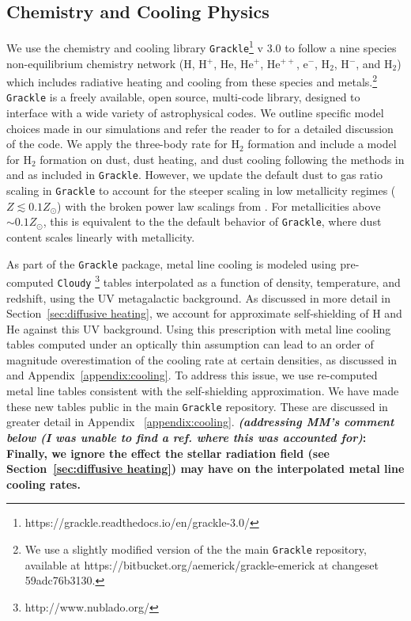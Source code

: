 \documentclass[twocolumn]{aastex61}
\begin{document}
\subsection{Chemistry and Cooling Physics}
\label{sec:chemistry}

We use the chemistry and cooling library \texttt{Grackle}\footnote{https://grackle.readthedocs.io/en/grackle-3.0/} v 3.0 to follow a nine species non-equilibrium chemistry network (H, H$^+$, He, He$^+$, He$^{++}$, e$^{-}$, H$_2$, H$^{-}$, and H$_{2}$) which includes radiative heating and cooling from these species and metals.\footnote{We use a slightly modified version of the the main \texttt{Grackle} repository, available at https://bitbucket.org/aemerick/grackle-emerick at changeset 59adc76b3130.} \texttt{Grackle} is a freely available, open source, multi-code library, designed to interface with a wide variety of astrophysical codes. We outline specific model choices made in our simulations and refer the reader to \citet{GrackleMethod} for a detailed discussion of the code. We apply the \citet{Glover2008} three-body rate for H$_{2}$ formation and include a model for H$_2$ formation on dust, dust heating, and dust cooling following the methods in \citet{2000ApJ...534..809O} and \citet{2005ApJ...626..627O} as included in \texttt{Grackle}. However, we update the default dust to gas ratio scaling in \texttt{Grackle} to account for the steeper scaling in low metallicity regimes ($Z \lesssim 0.1 Z_{\odot}$) with the broken power law scalings from \citet{Remy-Ruyer2014}. For metallicities above $\sim 0.1 Z_{\odot}$, this is equivalent to the the default behavior of \texttt{Grackle}, where dust content scales linearly with metallicity.

As part of the \texttt{Grackle} package, metal line cooling is modeled using pre-computed \texttt{Cloudy} \citep{Cloudy2013} \footnote{http://www.nublado.org/} tables interpolated as a function of density, temperature, and redshift, using the \citet{HM2012} UV metagalactic background. As discussed in more detail in Section~\ref{sec:diffusive heating}, we account for approximate self-shielding of H and He against this UV background. Using this prescription with metal line cooling tables computed under an optically thin assumption can lead to an order of magnitude overestimation of the cooling rate at certain densities, as discussed in \citet{Hu2017} and  Appendix~\ref{appendix:cooling}. To address this issue, we use re-computed metal line tables consistent with the self-shielding approximation.  We have made these new tables public in the main \texttt{Grackle} repository. These are discussed in greater detail in Appendix ~\ref{appendix:cooling}. {\bf {\it (addressing MM's comment below (I was unable to find a ref. where this was accounted for)}: Finally, we ignore the effect the stellar radiation field (see Section~\ref{sec:diffusive heating}) may have on the interpolated metal line cooling rates. }
\end{document}

